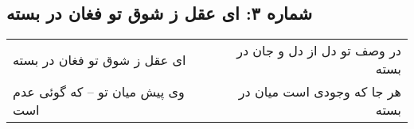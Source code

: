 \begin{center}
\section*{شماره ۳: ای عقل ز شوق تو فغان در بسته}
\label{sec:003}
\begin{longtable}{l p{0.5cm} r}
ای عقل ز شوق تو فغان در بسته
&&
در وصف تو دل از دل و جان در بسته
\\
وی پیش میان تو – که گوئی عدم است
&&
هر جا که وجودی است میان در بسته
\\
\end{longtable}
\end{center}
